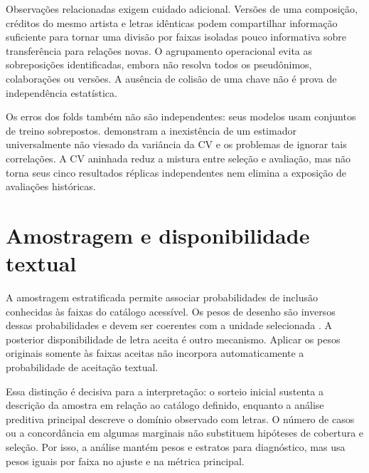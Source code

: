 Observações relacionadas exigem cuidado adicional. Versões de uma composição, créditos do mesmo artista e letras idênticas podem compartilhar informação suficiente para tornar uma divisão por faixas isoladas pouco informativa sobre transferência para relações novas. O agrupamento operacional evita as sobreposições identificadas, embora não resolva todos os pseudônimos, colaborações ou versões. A ausência de colisão de uma chave não é prova de independência estatística.

Os erros dos folds também não são independentes: seus modelos usam conjuntos de treino sobrepostos. \citet{bengio2004} demonstram a inexistência de um estimador universalmente não viesado da variância da CV e os problemas de ignorar tais correlações. A CV aninhada reduz a mistura entre seleção e avaliação, mas não torna seus cinco resultados réplicas independentes nem elimina a exposição de avaliações históricas.

\section{Amostragem e disponibilidade textual}
A amostragem estratificada permite associar probabilidades de inclusão conhecidas às faixas do catálogo acessível. Os pesos de desenho são inversos dessas probabilidades e devem ser coerentes com a unidade selecionada \citep{statcan2010}. A posterior disponibilidade de letra aceita é outro mecanismo. Aplicar os pesos originais somente às faixas aceitas não incorpora automaticamente a probabilidade de aceitação textual.

Essa distinção é decisiva para a interpretação: o sorteio inicial sustenta a descrição da amostra em relação ao catálogo definido, enquanto a análise preditiva principal descreve o domínio observado com letras. O número de casos ou a concordância em algumas marginais não substituem hipóteses de cobertura e seleção. Por isso, a análise mantém pesos e estratos para diagnóstico, mas usa pesos iguais por faixa no ajuste e na métrica principal.
